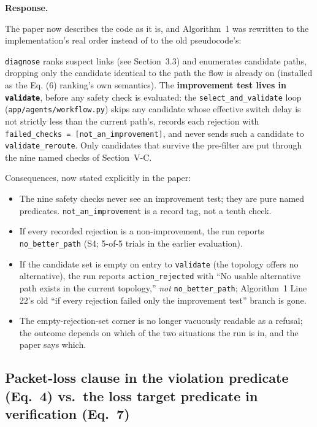 \documentclass[11pt,a4paper]{article}
\newenvironment{response}{\par\noindent\begin{minipage}{\linewidth}\small\textbf{Response.}\par}{\end{minipage}\medskip\par}
\begin{document}
\begin{response}
The paper now describes the code as it is, and Algorithm~1 was rewritten to
the implementation's real order instead of to the old pseudocode's:

\texttt{diagnose} ranks suspect links (see Section~3.3) and enumerates
candidate paths, dropping only the candidate identical to the path the flow
is already on (installed as the Eq. (6) ranking's own semantics). The
\textbf{improvement test lives in \texttt{validate}}, before any safety
check is evaluated: the \texttt{select\_and\_validate} loop
(\texttt{app/agents/workflow.py}) skips any candidate whose effective
switch delay is not strictly less than the current path's, records each
rejection with \texttt{failed\_checks = [not\_an\_improvement]}, and never
sends such a candidate to \texttt{validate\_reroute}. Only candidates that
survive the pre-filter are put through the nine named checks of Section~V-C.

Consequences, now stated explicitly in the paper:

\begin{itemize}
  \item The nine safety checks never see an improvement test; they are pure
    named predicates. \texttt{not\_an\_improvement} is a record tag, not a
    tenth check.
  \item If every recorded rejection is a non-improvement, the run reports
    \texttt{no\_better\_path} (S4; 5-of-5 trials in the earlier evaluation).
  \item If the candidate set is empty on entry to \texttt{validate} (the
    topology offers no alternative), the run reports \texttt{action\_rejected}
    with ``No usable alternative path exists in the current topology,''
    \emph{not} \texttt{no\_better\_path}; Algorithm~1 Line 22's old
    ``if every rejection failed only the improvement test'' branch is gone.
  \item The empty-rejection-set corner is no longer vacuously readable as a
    refusal; the outcome depends on which of the two situations the run is
    in, and the paper says which.
\end{itemize}
\end{response}

\subsection{Packet-loss clause in the violation predicate (Eq.~4) vs.\ the
loss target predicate in verification (Eq.~7)}
\end{document}
